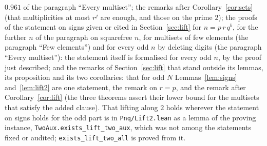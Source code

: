 \documentclass[11pt,a4paper]{amsart}
\theoremstyle{definition}
\theoremstyle{remark}
\newcommand{\lean}[1]{\texttt{#1}}
\begin{document}
$0.961$ of the paragraph ``Every multiset''; the remarks after Corollary~\ref{cor:sets} (that multiplicities at most $r^j$ are enough, and those on the prime $2$); the proofs of the statement on signs given or cited in Section~\ref{sec:lift} for $n=p\,r\,q^b$, for the further $n$ of the paragraph on squarefree $n$, for multisets of few elements (the paragraph ``Few elements'') and for every odd $n$ by deleting digits (the paragraph ``Every multiset''): the statement itself is formalised for every odd $n$, by the proof just described; and the remarks of Section~\ref{sec:lift} that stand outside its lemmas, its proposition and its two corollaries: that for odd $N$ Lemmas~\ref{lem:signs} and~\ref{lem:lift2} are one statement, the remark on $r=p$, and the remark after Corollary~\ref{cor:lift} (the three theorems assert their lower bound for the multisets that satisfy the added clause). That lifting along $2$ holds wherever the statement on signs holds for the odd part is in \lean{Pnq/Lift2.lean} as a lemma of the proving instance, \lean{TwoAux.exists\_lift\_two\_aux}, which was not among the statements fixed or audited; \lean{exists\_lift\_two\_all} is proved from it.
\end{document}
